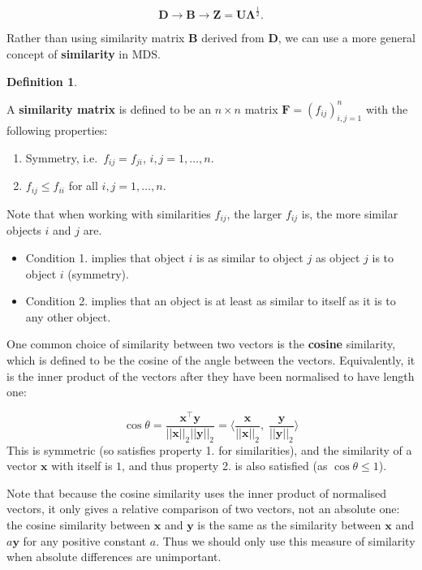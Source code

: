 \documentclass[
]{book}
\providecommand{\tightlist}{%
  \setlength{\itemsep}{0pt}\setlength{\parskip}{0pt}}
\theoremstyle{definition}
\newtheorem{definition}{Definition}[chapter]
\theoremstyle{definition}
\theoremstyle{definition}
\theoremstyle{definition}
\theoremstyle{remark}
\begin{document}
\[\mathbf D\longrightarrow \mathbf B\longrightarrow \mathbf Z=\mathbf U\boldsymbol \Lambda^{\frac{1}{2}}.\]

Rather than using similarity matrix \(\mathbf B\) derived from \(\mathbf D\), we can use a more general concept of \textbf{similarity} in MDS.

\begin{definition}
\protect\hypertarget{def:unnamed-chunk-20}{}\label{def:unnamed-chunk-20}

A \textbf{similarity matrix} is defined to be an \(n \times n\) matrix \({\mathbf F}=(f_{ij})_{i,j=1}^n\) with the following properties:

\begin{enumerate}
\def\labelenumi{\arabic{enumi}.}
\tightlist
\item
  Symmetry, i.e.~\(f_{ij} =f_{ji}\), \(i,j=1, \ldots , n\).
\item
  \(f_{ij} \leq f_{ii}\) for all \(i,j=1, \ldots , n\).
\end{enumerate}

\end{definition}

Note that when working with similarities \(f_{ij}\), the larger \(f_{ij}\) is, the more similar objects \(i\) and \(j\) are.

\begin{itemize}
\item
  Condition 1. implies that object \(i\) is as similar to object \(j\) as object \(j\) is to object \(i\) (symmetry).
\item
  Condition 2. implies that an object is at least as similar to itself as it is to any other object.
\end{itemize}

One common choice of similarity between two vectors is the \textbf{cosine} similarity, which is defined to be the cosine of the angle between the vectors. Equivalently, it is the inner product of the vectors after they have been normalised to have length one:

\[\cos \theta = \frac{\mathbf x^\top \mathbf y}{||\mathbf x||_2 ||\mathbf y||_2}=\langle \frac{\mathbf x}{||\mathbf x||_2}, \; \frac{\mathbf y}{||\mathbf y||_2}\rangle\]
This is symmetric (so satisfies property 1. for similarities), and the similarity of a vector \(\mathbf x\) with itself is \(1\), and thus property 2. is also satisfied (as \(\cos \theta \leq 1\)).

Note that because the cosine similarity uses the inner product of normalised vectors, it only gives a relative comparison of two vectors, not an absolute one: the cosine similarity between \(\mathbf x\) and \(\mathbf y\) is the same as the similarity between \(\mathbf x\) and \(a\mathbf y\) for any positive constant \(a\). Thus we should only use this measure of similarity when absolute differences are unimportant.
\end{document}
